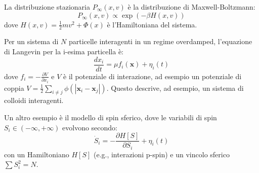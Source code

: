 La distribuzione stazionaria $P_{\infty}(x,v)$ è la distribuzione di Maxwell-Boltzmann:
\begin{equation}
P_{\infty}(x,v) \propto \exp\left(-\beta H(x,v)\right)
\end{equation}
dove $H(x,v) = \frac{1}{2}mv^2 + \Phi(x)$ è l'Hamiltoniana del sistema.

Per un sistema di $N$ particelle interagenti in un regime overdamped, l'equazione di Langevin per la i-esima particella è:
\begin{equation}
\frac{dx_i}{dt} = \mu f_i(\mathbf{x}) + \eta_i(t)
\end{equation}
dove $f_i = -\frac{\partial V}{\partial x_i}$ e $V$ è il potenziale di interazione, ad esempio un potenziale di coppia $V = \frac{1}{2} \sum_{i \ne j} \phi(|\mathbf{x}_i - \mathbf{x}_j|)$. Questo descrive, ad esempio, un sistema di colloidi interagenti.

Un altro esempio è il modello di spin sferico, dove le variabili di spin $S_i \in (-\infty, +\infty)$ evolvono secondo:
\begin{equation}
\dot{S}_i = -\frac{\partial H[S]}{\partial S_i} + \eta_i(t)
\end{equation}
con un Hamiltoniano $H[S]$ (e.g., interazioni p-spin) e un vincolo sferico $\sum S_i^2 = N$.